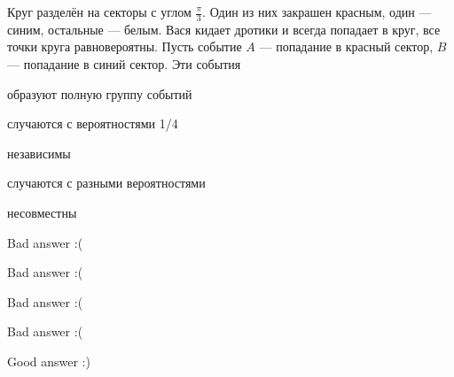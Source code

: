 
\begin{question}
Круг разделён на секторы с углом \(\frac{\pi}{3}\). Один из них закрашен
красным, один — синим, остальные — белым. Вася кидает дротики и
всегда попадает в круг, все точки круга равновероятны. Пусть событие
\(A\) — попадание в красный сектор, \(B\) — попадание в синий
сектор. Эти события
\begin{answerlist}
  \item образуют полную группу событий
  \item случаются с вероятностями 1/4
  \item независимы
  \item случаются с разными вероятностями
  \item несовместны
\end{answerlist}
\end{question}

\begin{solution}
\begin{answerlist}
  \item Bad answer :(
  \item Bad answer :(
  \item Bad answer :(
  \item Bad answer :(
  \item Good answer :)
\end{answerlist}
\end{solution}

